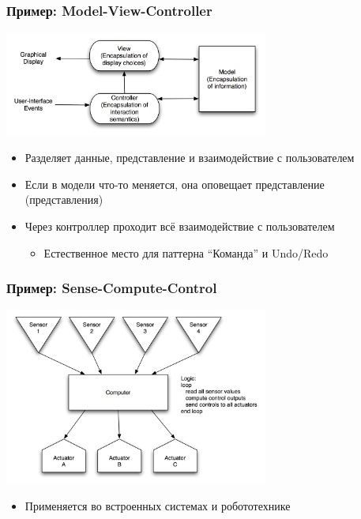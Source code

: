 \documentclass{../cscslides}
\begin{document}
    \begin{frame}
        \frametitle{Пример: Model-View-Controller}
        \begin{center}
            \includegraphics[width=0.65\textwidth]{mvc.png}
        \end{center}
        \begin{itemize}
            \item Разделяет данные, представление и взаимодействие с пользователем
            \item Если в модели что-то меняется, она оповещает представление (представления)
            \item Через контроллер проходит всё взаимодействие с пользователем
            \begin{itemize}
                \item Естественное место для паттерна ``Команда'' и Undo/Redo
            \end{itemize}
        \end{itemize}
    \end{frame}

    \begin{frame}
        \frametitle{Пример: Sense-Compute-Control}
        \begin{center}
            \includegraphics[width=0.65\textwidth]{senseComputeControl.png}
        \end{center}
        \begin{itemize}
            \item Применяется во встроенных системах и робототехнике
        \end{itemize}
    \end{frame}
\end{document}
